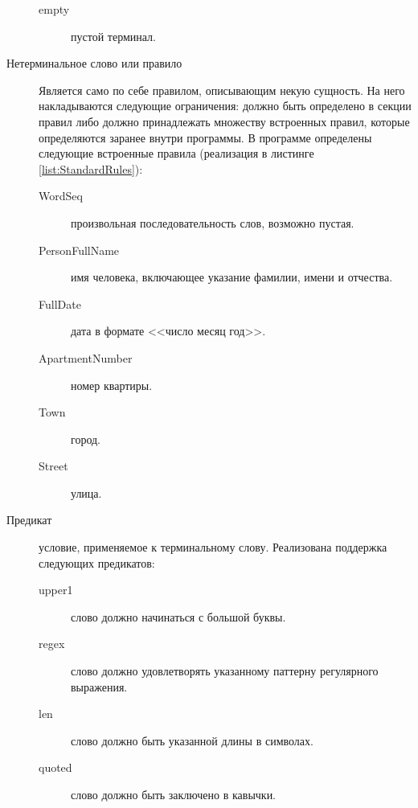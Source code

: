 \begin{description}
\begin{description}
    \item [empty] пустой терминал.
  \end{description}
  \item[Нетерминальное слово или правило] Является само по себе правилом, описывающим некую сущность. На него накладываются следующие ограничения: должно быть определено в секции правил либо должно принадлежать множеству встроенных правил, которые определяются заранее внутри программы. В программе определены следующие встроенные правила (реализация в листинге \ref{list:StandardRules}):
  \begin{description}
    \item[WordSeq] произвольная последовательность слов, возможно пустая.
    \item[PersonFullName] имя человека, включающее указание фамилии, имени и отчества.
    \item[FullDate] дата в формате <<число месяц год>>.
    \item[ApartmentNumber] номер квартиры.
    \item[Town] город.
    \item[Street] улица.
  \end{description}
  \item[Предикат] условие, применяемое к терминальному слову. Реализована поддержка следующих предикатов:
  \begin{description}
    \item[upper1] слово должно начинаться с большой буквы.
    \item[regex] слово должно удовлетворять указанному паттерну регулярного выражения.
    \item[len] слово должно быть указанной длины в символах.
    \item[quoted] слово должно быть заключено в кавычки.
  \end{description}
\end{description}

